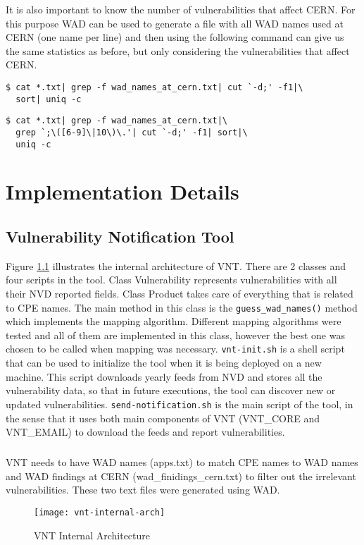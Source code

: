 It is also important to know the number of vulnerabilities that affect CERN. For this purpose WAD can be used to generate a file with all WAD names used at CERN (one name per line) and then using the following command can give us the same statistics as before, but only considering the vulnerabilities that affect CERN.
\begin{framed}
\begin{verbatim}
$ cat *.txt| grep -f wad_names_at_cern.txt| cut `-d;' -f1|\
  sort| uniq -c
\end{verbatim}
\end{framed}
\begin{framed}
\begin{verbatim}
$ cat *.txt| grep -f wad_names_at_cern.txt|\
  grep `;\([6-9]\|10\)\.'| cut `-d;' -f1| sort|\
  uniq -c
\end{verbatim}
\end{framed}
%
%
\chapter{Implementation Details}
\label{implementation-details}
\section{Vulnerability Notification Tool}

Figure \ref{figure:vnt-internal-arch} illustrates the internal architecture of VNT. 
There are 2 classes and four scripts in the tool. Class Vulnerability represents vulnerabilities with all their NVD reported fields. 
Class Product takes care of everything that is related to CPE names. The main method in this class is the \texttt{guess\_wad\_names()} method which implements the mapping algorithm. 
Different mapping algorithms were tested and all of them are implemented in this class, however the best one was chosen to be called when mapping was necessary. \texttt{vnt-init.sh} is a shell script that can be used to initialize the tool when it is being deployed on a new machine. This script downloads yearly feeds from NVD and stores all the vulnerability data, so that in future executions, the tool can discover new or updated vulnerabilities. \texttt{send-notification.sh} is the main script of the tool, in the sense that it uses both main components of VNT (VNT\_CORE and VNT\_EMAIL) to download the feeds and report vulnerabilities.
\paragraph{}
VNT needs to have WAD names (apps.txt) to match CPE names to WAD names and WAD findings at CERN (wad\_finidings\_cern.txt) to filter out the irrelevant vulnerabilities. These two text files were generated using WAD. 
\begin{figure}[H]
  \centering
    \texttt{[image: vnt-internal-arch]}
  \caption{VNT Internal Architecture}
   \label{figure:vnt-internal-arch}
\end{figure}
\clearpage
